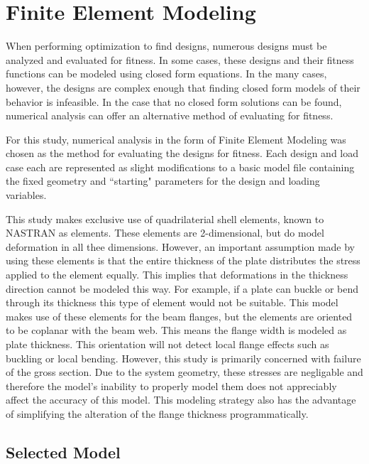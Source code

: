 \section{Finite Element Modeling}

When performing optimization to find designs, numerous designs must be analyzed and evaluated for fitness. In some cases, these designs and their fitness functions can be modeled using closed form equations. In the many cases, however, the designs are complex enough that finding closed form models of their behavior is infeasible. In the case that no closed form solutions can be found, numerical analysis can offer an alternative method of evaluating for fitness. 

For this study, numerical analysis in the form of Finite Element Modeling was chosen as the method for evaluating the designs for fitness. Each design and load case each are represented as slight modifications to a basic model file containing the fixed geometry and ``starting" parameters for the design and loading variables.  

This study makes exclusive use of quadrilaterial shell elements, known to NASTRAN as  elements. These elements are 2-dimensional, but do model deformation in all thee dimensions. However, an important assumption made by using these elements is that the entire thickness of the plate distributes the stress applied to the element equally. This implies that deformations in the thickness direction cannot be modeled this way. For example, if a plate can buckle or bend through its thickness this type of element would not be suitable. This model makes use of these elements for the beam flanges, but the elements are oriented to be coplanar with the beam web. This means the flange width is modeled as plate thickness. This orientation will not detect local flange effects such as buckling or local bending. However, this study is primarily concerned with failure of the gross section. Due to the system geometry, these stresses are negligable and therefore the model's inability to properly model them does not appreciably affect the accuracy of this model. This modeling strategy also has the advantage of simplifying the alteration of the flange thickness programmatically. 

\subsection{Selected Model}

